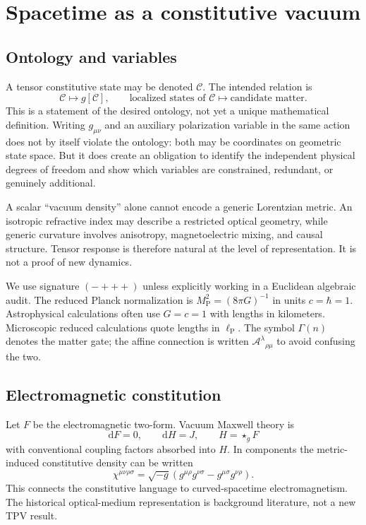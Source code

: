 \documentclass[11pt,oneside]{report}
\newcommand{\dd}{\mathrm d}
\newcommand{\MP}{M_{\mathrm P}}
\newcommand{\lp}{\ell_{\mathrm P}}
\begin{document}
\chapter{Spacetime as a constitutive vacuum}
\section{Ontology and variables}
A tensor constitutive state may be denoted $\mathcal C$. The intended relation is
\begin{equation}
\mathcal C\longmapsto g[\mathcal C],\qquad
\text{localized states of }\mathcal C\longmapsto\text{candidate matter}.
\end{equation}
This is a statement of the desired ontology, not yet a unique mathematical definition. Writing $g_{\mu\nu}$ and an auxiliary polarization variable in the same action does not by itself violate the ontology: both may be coordinates on geometric state space. But it does create an obligation to identify the independent physical degrees of freedom and show which variables are constrained, redundant, or genuinely additional.

A scalar ``vacuum density'' alone cannot encode a generic Lorentzian metric. An isotropic refractive index may describe a restricted optical geometry, while generic curvature involves anisotropy, magnetoelectric mixing, and causal structure. Tensor response is therefore natural at the level of representation. It is not a proof of new dynamics.

We use signature $(-+++)$ unless explicitly working in a Euclidean algebraic audit. The reduced Planck normalization is $\MP^2=(8\pi G)^{-1}$ in units $c=\hbar=1$. Astrophysical calculations often use $G=c=1$ with lengths in kilometers. Microscopic reduced calculations quote lengths in $\lp$. The symbol $\Gamma(n)$ denotes the matter gate; the affine connection is written $\mathcal A^\lambda{}_{\rho\mu}$ to avoid confusing the two.

\section{Electromagnetic constitution}
Let $F$ be the electromagnetic two-form. Vacuum Maxwell theory is
\begin{equation}
\dd F=0,\qquad \dd H=J,\qquad H=\star_g F
\end{equation}
with conventional coupling factors absorbed into $H$. In components the metric-induced constitutive density can be written
\begin{equation}
\chi^{\mu\nu\rho\sigma}=\sqrt{-g}
(g^{\mu\rho}g^{\nu\sigma}-g^{\mu\sigma}g^{\nu\rho}).
\end{equation}
This connects the constitutive language to curved-spacetime electromagnetism. The historical optical-medium representation is background literature, not a new TPV result.
\end{document}
